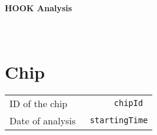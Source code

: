 \documentclass[a4paper, 10pt]{article}
\begin{document}
 
\fontsize{8pt}{8pt} 
\bfseries
\sf
{\huge {\bf HOOK Analysis}}\\ \\ \\
\section{Chip}
\begin{tabular}{lr}
	ID of the chip &\verb| chipId | \\
	Date of analysis &\verb| startingTime| \\
\end{tabular}\\	
\end{document}
